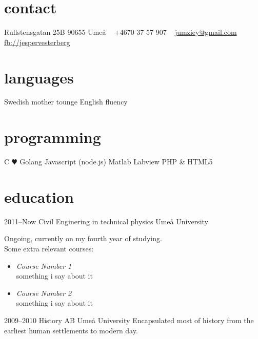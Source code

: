 \documentclass[]{friggeri-cv} %
\begin{document}


\begin{aside} %
\section{contact}
Rullstensgatan 25B
90655 Umeå
~
+4670 37 57 907
~
\href{mailto:jumziey@gmail.com}{jumziey@gmail.com}
\href{https://www.facebook.com/jesper.vesterberlg}{fb://jespervesterberg}
\section{languages}
Swedish mother tounge
English fluency
\section{programming}
C{\color{red} $\varheartsuit$}
Golang
Javascript (node.js)
Matlab
Labview
PHP \& HTML5
\end{aside}


\section{education}

\begin{entrylist}
\entry
{2011--Now}
{Civil Enginering {\normalfont in technical physics}}
{Umeå University}
{Ongoing, currently on my fourth year of studying.\\
Some extra relevant courses: 
\begin{itemize}
\item \emph{Course Number 1} \\
	something i say about it 
\item \emph{Course Number 2} \\
	something i say about it 
\end{itemize}
}
\entry
{2009--2010}
{History {\normalfont AB}}
{Umeå University}
{Encapsulated most of history from the earliest human settlements to modern day.}
\end{entrylist}
\end{document}
